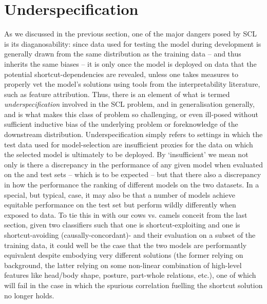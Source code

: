 \section{Underspecification}\label{sub:underspecification}
 
As we discussed in the previous section, one of the major dangers posed by SCL is its
diaganosability: since data used for testing the model during development is generally drawn from
the same distribution as the training data -- and thus inherits the same biases -- it is only once
the model is deployed on \ood{} data that the potential shortcut-dependencies are revealed, unless
one takes measures to properly vet the model's solutions using tools from the interpretability
literature, such as feature attribution.
%
Thus, there is an element of what is termed \emph{underspecification} involved in the SCL problem,
and in \ood{} generalisation generally, and is what makes this class of problem so challenging, or
even ill-posed without sufficient inductive bias of the underlying problem or foreknowledge of the
downstream distribution.
%
Underspecification simply refers to settings in which the \iid{} test data used for model-selection are
insufficient proxies for the data on which the selected model is ultimately to be deployed.
%
By `insufficient' we mean not only is there a discrepancy in the performance of any given model
when evaluated on the \iid{} and \ood{} test sets -- which is to be expected -- but that there also
a discrepancy in how the performance the ranking of different models on the two datasets.
%
In a special, but typical, case, it may also be that a number of models achieve equitable
performance on the \iid{} test set but perform wildly differently when exposed to \ood{} data.
%
To tie this in with our cows vs. camels conceit from the last section, given two classifiers such
that one is shortcut-exploiting and one is shortcut-avoiding (causally-concordant)- and their
evaluation on a subset of the training data, it could well be the case that the two models are
performantly equivalent despite embodying very different solutions (the former relying on
background, the latter relying on some non-linear combination of high-level features like head/body
shape, posture, part-whole relations, etc.), one of which will fail in the \ood{} case in which the
spurious correlation fuelling the shortcut solution no longer holds.

